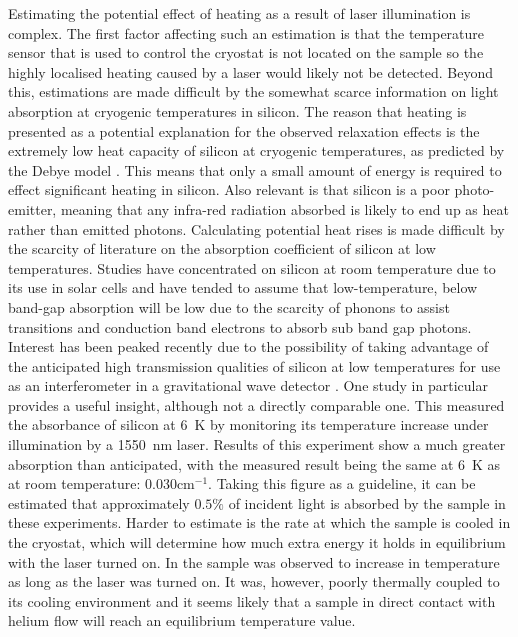 Estimating the potential effect of heating as a result of laser illumination is complex.
The first factor affecting such an estimation is that the temperature sensor that is used to control the cryostat is not located on the sample so the highly localised heating caused by a laser would likely not be detected.
Beyond this, estimations are made difficult by the somewhat scarce information on light absorption at cryogenic temperatures in silicon.
The reason that heating is presented as a potential explanation for the observed relaxation effects is the extremely low heat capacity of silicon at cryogenic temperatures, as predicted by the Debye model \cite{ANDP:ANDP19123441404}.
This means that only a small amount of energy is required to effect significant heating in silicon.
Also relevant is that silicon is a poor photo-emitter, meaning that any infra-red radiation absorbed is likely to end up as heat rather than emitted photons.
Calculating potential heat rises is made difficult by the scarcity of literature on the absorption coefficient of silicon at low temperatures.
Studies have concentrated on silicon at room temperature due to its use in solar cells and have tended to assume that low-temperature, below band-gap absorption will be low due to the scarcity of phonons to assist transitions and conduction band electrons to absorb sub band gap photons.
Interest has been peaked recently due to the possibility of taking advantage of the anticipated high transmission qualities of silicon at low temperatures for use as an interferometer in a gravitational wave detector \cite{Degallaix2014}.
One study in particular provides a useful insight, although not a directly comparable one.
This measured the absorbance of silicon at 6~K by monitoring its temperature increase under illumination by a 1550~nm laser.
Results of this experiment show a much greater absorption than anticipated, with the measured result being the same at 6~K as at room temperature: 0.030cm$^{-1}$.
Taking this figure as a guideline, it can be estimated that approximately $0.5\%$ of incident light is absorbed by the sample in these experiments.
Harder to estimate is the rate at which the sample is cooled in the cryostat, which will determine how much extra energy it holds in equilibrium with the laser turned on.
In \cite{Degallaix2014} the sample was observed to increase in temperature as long as the laser was turned on.
It was, however, poorly thermally coupled to its cooling environment and it seems likely that a sample in direct contact with helium flow will reach an equilibrium temperature value.
